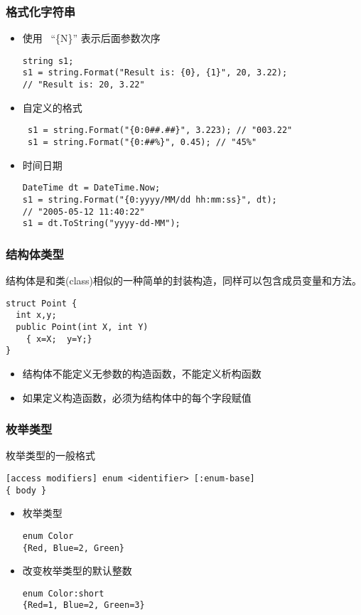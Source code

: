 \begin{frame}[fragile]
\frametitle{格式化字符串}
\CJKindent
\begin{itemize}
\item 使用~ ``\{N\}'' 表示后面参数次序
\begin{lstlisting}
string s1;
s1 = string.Format("Result is: {0}, {1}", 20, 3.22);
// "Result is: 20, 3.22"

\end{lstlisting}
\pause
\item 自定义的格式
\begin{lstlisting}
 s1 = string.Format("{0:0##.##}", 3.223); // "003.22"
 s1 = string.Format("{0:##%}", 0.45); // "45%"
\end{lstlisting}
\pause
\item 时间日期
\begin{lstlisting}
DateTime dt = DateTime.Now;
s1 = string.Format("{0:yyyy/MM/dd hh:mm:ss}", dt);
// "2005-05-12 11:40:22"
s1 = dt.ToString("yyyy-dd-MM");
\end{lstlisting}
\end{itemize}
\end{frame}

\begin{frame}[fragile]
\frametitle{结构体类型}
\CJKindent 结构体是和类(class)相似的一种简单的封装构造，同样可以包含成员变量和方法。
\begin{lstlisting}[escapeinside=<>]
struct Point {
  int x,y;
  public Point(int X, int Y)
    { x=X;  y=Y;}
}
\end{lstlisting}
\begin{itemize}
\item 结构体不能定义无参数的构造函数，不能定义析构函数
\item 如果定义构造函数，必须为结构体中的每个字段赋值
\end{itemize}
\end{frame}


\begin{frame}[fragile]
\frametitle{枚举类型}
枚举类型的一般格式
\begin{lstlisting}
[access modifiers] enum <identifier> [:enum-base]
{ body }
\end{lstlisting}

\begin{itemize}
    \setlength{\itemsep}{8pt plus 1pt}
\item 枚举类型
\begin{lstlisting}
enum Color
{Red, Blue=2, Green}

\end{lstlisting}

\item 改变枚举类型的默认整数
\begin{lstlisting}
enum Color:short
{Red=1, Blue=2, Green=3}
\end{lstlisting}
\end{itemize}
\end{frame}

